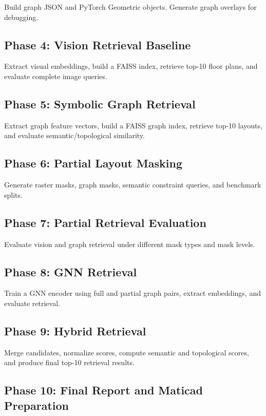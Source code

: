 \documentclass[11pt,a4paper]{article}
\begin{document}
Build graph JSON and PyTorch Geometric objects. Generate graph overlays for debugging.

\subsection{Phase 4: Vision Retrieval Baseline}

Extract visual embeddings, build a FAISS index, retrieve top-10 floor plans, and evaluate complete image queries.

\subsection{Phase 5: Symbolic Graph Retrieval}

Extract graph feature vectors, build a FAISS graph index, retrieve top-10 layouts, and evaluate semantic/topological similarity.

\subsection{Phase 6: Partial Layout Masking}

Generate raster masks, graph masks, semantic constraint queries, and benchmark splits.

\subsection{Phase 7: Partial Retrieval Evaluation}

Evaluate vision and graph retrieval under different mask types and mask levels.

\subsection{Phase 8: GNN Retrieval}

Train a GNN encoder using full and partial graph pairs, extract embeddings, and evaluate retrieval.

\subsection{Phase 9: Hybrid Retrieval}

Merge candidates, normalize scores, compute semantic and topological scores, and produce final top-10 retrieval results.

\subsection{Phase 10: Final Report and Maticad Preparation}
\end{document}
